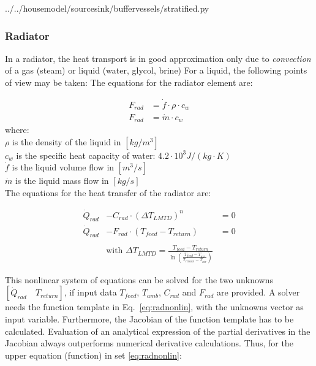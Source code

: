 
{../../housemodel/sourcesink/buffervessels/stratified.py}



\subsubsection{Radiator}

In a radiator, the heat transport is in good approximation only due to \emph{convection} of a gas (steam) or liquid (water, glycol, brine) For a liquid, the following points of view may be taken:
The equations for the radiator element are:

{\color{blue}
	\begin{equation}
		\label{eq:radnonlin}
		\begin{aligned}
			F_{rad} &= \dot{f} \cdot \rho \cdot c_w  \\
			F_{rad} &= \dot{m} \cdot c_w  
		\end{aligned}
	\end{equation}
}
where: \\
$\rho$ is the density of the liquid in $[kg/m^3]$ \\
$c_w$ is the specific heat capacity of water: $4.2 \cdot 10^3 J/(kg \cdot K)$ \\
$\dot{f}$ is the liquid volume flow in $[m^3/s]$ \\
$\dot{m}$ is the liquid mass flow in $[kg/s]$ \\

The equations for the heat transfer of the radiator are: 

{\color{blue}
	\begin{equation}
		\label{eq:radnonlin}
		\begin{aligned}
			\dot{Q}_{rad} &- C_{rad} \cdot (\Delta T_{LMTD})^n &= 0 \\
			\dot{Q}_{rad} &- F_{rad} \cdot (T_{feed} - T_{return}) &= 0 \\ \\
			&\text{with } \Delta T_{LMTD} = \frac{T_{feed} - T_{return}}{\ln\left(\frac{T_{feed} -T_{air}}{T_{return} - T_{air}}\right)}
		\end{aligned}
	\end{equation}
}

This nonlinear system of equations can be solved for the two unknowns $[\dot{Q}_{rad} \quad T_{return}]$, if input data $T_{feed}$, $ T_{amb}$, $C_{rad}$ and $F_{rad}$ are provided. A solver needs the function template in Eq.~\ref{eq:radnonlin}, with the unknowns vector as input variable. Furthermore, the Jacobian of the function template has to be calculated. Evaluation of an analytical expression of the partial derivatives in the Jacobian always outperforms numerical derivative calculations. Thus, for the upper equation (function) in set \ref{eq:radnonlin}:

